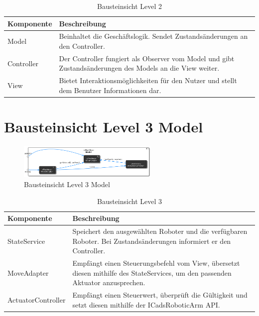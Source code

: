 \begin{table}[h!]
\centering
\begin{tabular}{|p{4cm}|p{9cm}|}
\hline
\textbf{Komponente} & \textbf{Beschreibung} \\ \hline
Model & Beinhaltet die Geschäftslogik. Sendet Zustandsänderungen an den Controller. \\ \hline
Controller & Der Controller fungiert als Observer vom Model und gibt Zustandsänderungen des Models an die View weiter. \\ \hline
View & Bietet Interaktionsmöglichkeiten für den Nutzer und stellt dem Benutzer Informationen dar. 
\end{tabular}
\caption{Bausteinsicht Level 2}
\label{tab:lvl2}
\end{table}
\newpage

\section{Bausteinsicht Level 3 Model}
\begin{figure}[h] %
    \centering
    \includegraphics[width=0.6\textwidth]{diagrams/baustein_lvl_3_model.png}
    \caption{Bausteinsicht Level 3 Model}
\end{figure}

\begin{table}[h!]
\centering
\begin{tabular}{|p{4cm}|p{9cm}|}
\hline
\textbf{Komponente} & \textbf{Beschreibung} \\ \hline
StateService & Speichert den ausgewählten Roboter und die verfügbaren Roboter. Bei Zustandsänderungen informiert er den Controller. \\ \hline
MoveAdapter  & Empfängt einen Steuerungsbefehl vom View, übersetzt diesen mithilfe des StateServices, um den passenden Aktuator anzusprechen. \\ \hline
ActuatorController & Empfängt einen Steuerwert, überprüft die Gültigkeit und setzt diesen mithilfe der ICadsRoboticArm API. \\ \hline
\end{tabular}
\caption{Bausteinsicht Level 3}
\label{tab:lvl3}
\end{table}

